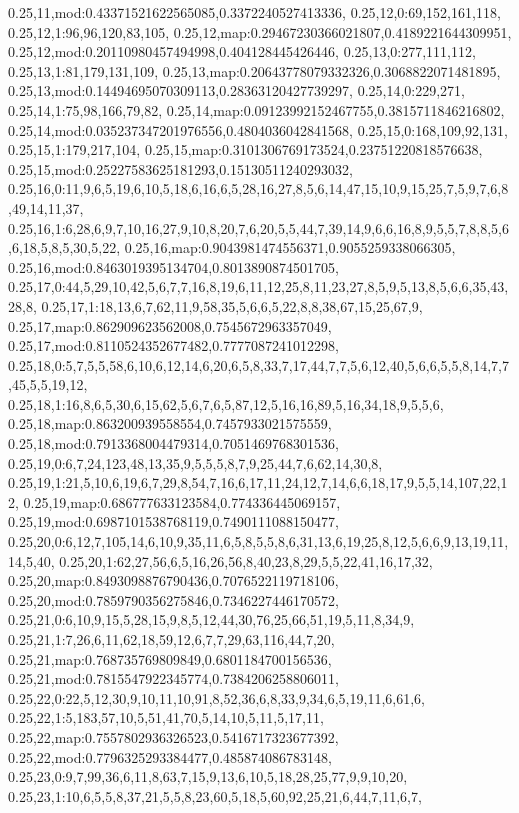 0.25,11,mod:0.43371521622565085,0.3372240527413336,
0.25,12,0:69,152,161,118,
0.25,12,1:96,96,120,83,105,
0.25,12,map:0.29467230366021807,0.4189221644309951,
0.25,12,mod:0.20110980457494998,0.404128445426446,
0.25,13,0:277,111,112,
0.25,13,1:81,179,131,109,
0.25,13,map:0.20643778079332326,0.3068822071481895,
0.25,13,mod:0.14494695070309113,0.28363120427739297,
0.25,14,0:229,271,
0.25,14,1:75,98,166,79,82,
0.25,14,map:0.09123992152467755,0.3815711846216802,
0.25,14,mod:0.035237347201976556,0.4804036042841568,
0.25,15,0:168,109,92,131,
0.25,15,1:179,217,104,
0.25,15,map:0.3101306769173524,0.23751220818576638,
0.25,15,mod:0.25227583625181293,0.15130511240293032,
0.25,16,0:11,9,6,5,19,6,10,5,18,6,16,6,5,28,16,27,8,5,6,14,47,15,10,9,15,25,7,5,9,7,6,8,49,14,11,37,
0.25,16,1:6,28,6,9,7,10,16,27,9,10,8,20,7,6,20,5,5,44,7,39,14,9,6,6,16,8,9,5,5,7,8,8,5,6,6,18,5,8,5,30,5,22,
0.25,16,map:0.9043981474556371,0.9055259338066305,
0.25,16,mod:0.8463019395134704,0.8013890874501705,
0.25,17,0:44,5,29,10,42,5,6,7,7,16,8,19,6,11,12,25,8,11,23,27,8,5,9,5,13,8,5,6,6,35,43,28,8,
0.25,17,1:18,13,6,7,62,11,9,58,35,5,6,6,5,22,8,8,38,67,15,25,67,9,
0.25,17,map:0.862909623562008,0.7545672963357049,
0.25,17,mod:0.8110524352677482,0.7777087241012298,
0.25,18,0:5,7,5,5,58,6,10,6,12,14,6,20,6,5,8,33,7,17,44,7,7,5,6,12,40,5,6,6,5,5,8,14,7,7,45,5,5,19,12,
0.25,18,1:16,8,6,5,30,6,15,62,5,6,7,6,5,87,12,5,16,16,89,5,16,34,18,9,5,5,6,
0.25,18,map:0.863200939558554,0.7457933021575559,
0.25,18,mod:0.7913368004479314,0.7051469768301536,
0.25,19,0:6,7,24,123,48,13,35,9,5,5,5,8,7,9,25,44,7,6,62,14,30,8,
0.25,19,1:21,5,10,6,19,6,7,29,8,54,7,16,6,17,11,24,12,7,14,6,6,18,17,9,5,5,14,107,22,12,
0.25,19,map:0.686777633123584,0.774336445069157,
0.25,19,mod:0.6987101538768119,0.7490111088150477,
0.25,20,0:6,12,7,105,14,6,10,9,35,11,6,5,8,5,5,8,6,31,13,6,19,25,8,12,5,6,6,9,13,19,11,14,5,40,
0.25,20,1:62,27,56,6,5,16,26,56,8,40,23,8,29,5,5,22,41,16,17,32,
0.25,20,map:0.8493098876790436,0.7076522119718106,
0.25,20,mod:0.7859790356275846,0.7346227446170572,
0.25,21,0:6,10,9,15,5,28,15,9,8,5,12,44,30,76,25,66,51,19,5,11,8,34,9,
0.25,21,1:7,26,6,11,62,18,59,12,6,7,7,29,63,116,44,7,20,
0.25,21,map:0.768735769809849,0.6801184700156536,
0.25,21,mod:0.7815547922345774,0.7384206258806011,
0.25,22,0:22,5,12,30,9,10,11,10,91,8,52,36,6,8,33,9,34,6,5,19,11,6,61,6,
0.25,22,1:5,183,57,10,5,51,41,70,5,14,10,5,11,5,17,11,
0.25,22,map:0.7557802936326523,0.5416717323677392,
0.25,22,mod:0.7796325293384477,0.485874086783148,
0.25,23,0:9,7,99,36,6,11,8,63,7,15,9,13,6,10,5,18,28,25,77,9,9,10,20,
0.25,23,1:10,6,5,5,8,37,21,5,5,8,23,60,5,18,5,60,92,25,21,6,44,7,11,6,7,
